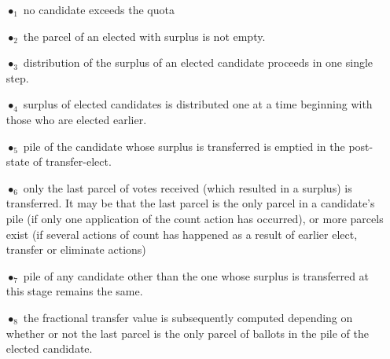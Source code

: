 \documentclass[10pt,conference]{IEEEtran}
\begin{document}
\begin{itemize}
\item[$\bullet_{1}$] no  candidate exceeds the quota
\item[$\bullet_{2}$] the  parcel of an elected with surplus is not empty.
\item[$\bullet_{3}$] distribution of the surplus of an elected candidate proceeds in one single step.
\item[$\bullet_{4}$] surplus of elected candidates is distributed one at a time beginning with those who are elected earlier. 
\item[$\bullet_{5}$] pile of the candidate whose surplus is transferred is emptied in the post-state of transfer-elect.
\item[$\bullet_{6}$] only the last parcel of votes  received (which resulted in a surplus) is transferred. It may be that the last parcel is the only parcel in a candidate's pile (if only one application of the count action has occurred), or more parcels exist (if several actions of count has happened as a result of earlier  elect, transfer or eliminate actions)
\item[$\bullet_{7}$] pile of any candidate other than the one whose surplus is transferred at this stage remains the same.
\item[$\bullet_{8}$] the fractional transfer value is subsequently computed depending on whether or not the last parcel is the only parcel of ballots in the pile of the elected candidate. 
\end{itemize}
\end{document}
